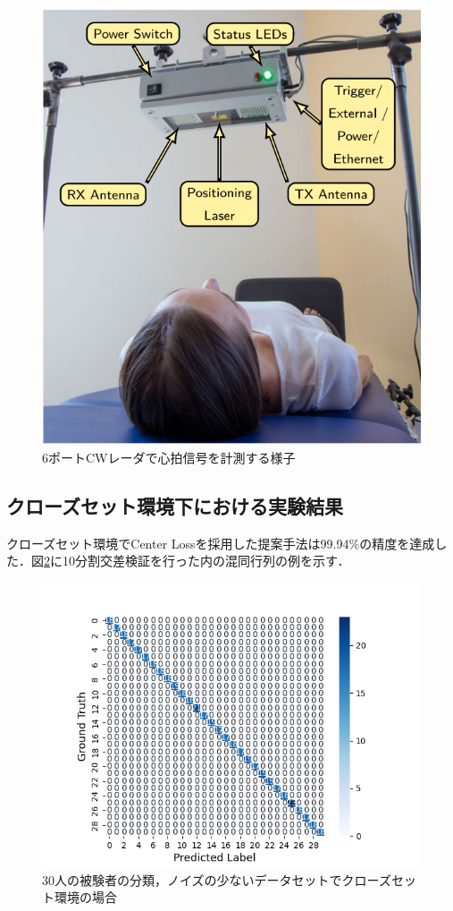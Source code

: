 \begin{figure}[H]
\begin{center}
\includegraphics[width=0.8\linewidth]{./fig/radar_setting_clean.png}
\end{center}
\caption{6ポートCWレーダで心拍信号を計測する様子\cite{paper:30-dataset}}
\label{fig:setting_clean}
\end{figure}

\subsection{クローズセット環境下における実験結果}
クローズセット環境でCenter Lossを採用した提案手法は99.94\%の精度を達成した．図\ref{fig:30close-conf}に10分割交差検証を行った内の混同行列の例を示す．
\begin{figure}[H]
\begin{center}
\includegraphics[width=\linewidth]{./fig/clean_dataset/cross_val_Fold0_close.png}
\end{center}
\caption{30人の被験者の分類，ノイズの少ないデータセットでクローズセット環境の場合}
\label{fig:30close-conf}
\end{figure}

